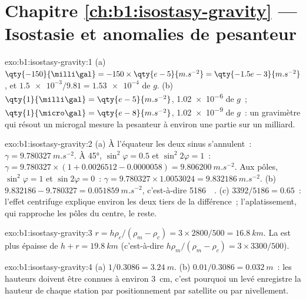 \section*{Chapitre \ref{ch:b1:isostasy-gravity} --- Isostasie et anomalies de pesanteur}

\begin{solution}{exo:b1:isostasy-gravity:1}
(a) $\qty{-150}{\milli\gal} = -150\times\qty{e-5}{m.s^{-2}} = \qty{-1.5e-3}{m.s^{-2}}$,
et $\num{1.5e-3}/9.81 = \num{1.53e-4}$ de $g$. (b) $\qty{1}{\milli\gal} =
\qty{e-5}{m.s^{-2}}$, \num{1.02e-6} de $g$~; $\qty{1}{\micro\gal} =
\qty{e-8}{m.s^{-2}}$, \num{1.02e-9} de $g$~: un gravimètre qui résout un
microgal mesure la pesanteur à environ une partie sur un milliard.
\end{solution}

\begin{solution}{exo:b1:isostasy-gravity:2}
(a) À l'équateur les deux sinus s'annulent~: $\gamma = \qty{9.780327}{m.s^{-2}}$. À
\ang{45}, $\sin^2\varphi = 0.5$ et $\sin^2 2\varphi = 1$~:
$\gamma = 9.780327\times(1 + 0.0026512 - 0.0000058) = \qty{9.806200}{m.s^{-2}}$.
Aux pôles, $\sin^2\varphi = 1$ et $\sin 2\varphi = 0$~:
$\gamma = 9.780327\times1.0053024 = \qty{9.832186}{m.s^{-2}}$.
(b) $9.832186 - 9.780327 = \qty{0.051859}{m.s^{-2}}$, c'est-à-dire
\qty{5186}{\milli\gal}. (c) $3392/5186 = 0.65$~: l'effet centrifuge explique
environ les deux tiers de la différence~; l'aplatissement, qui rapproche les pôles
du centre, le reste.
\end{solution}

\begin{solution}{exo:b1:isostasy-gravity:3}
$r = h\rho_c/(\rho_m - \rho_c) = 3\times2800/500 = \qty{16.8}{km}$. La  est
plus épaisse de $h + r = \qty{19.8}{km}$ (c'est-à-dire $h\rho_m/(\rho_m - \rho_c) =
3\times3300/500$).
\end{solution}

\begin{solution}{exo:b1:isostasy-gravity:4}
(a) $1/0.3086 = \qty{3.24}{m}$. (b) $0.01/0.3086 = \qty{0.032}{m}$~: les hauteurs
doivent être connues à environ \qty{3}{cm}, c'est pourquoi un levé enregistre la
hauteur de chaque station par positionnement par satellite ou par nivellement.
\end{solution}

